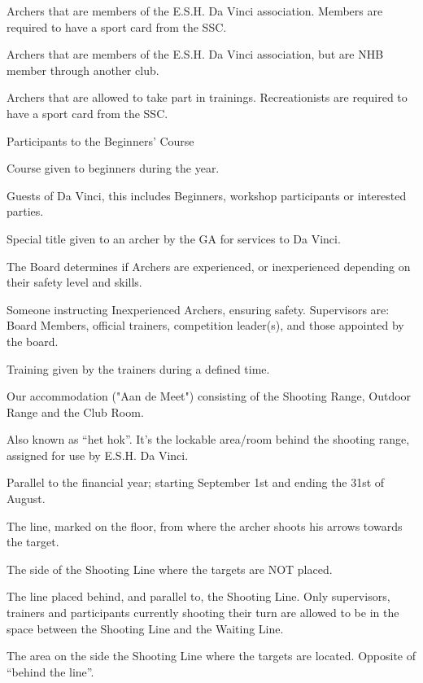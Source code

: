 \documentclass[a4paper]{article}
\begin{document}
\begin{description}[font=\sffamily\bfseries, leftmargin=1cm, style=nextline]
\item[Member]
Archers that are members of the E.S.H. Da Vinci association. Members are required to have a sport card from the SSC.
\item[External Member]
Archers that are members of the E.S.H. Da Vinci association, but are NHB member through another club.
\item[Recreationist]
Archers that are allowed to take part in trainings. Recreationists are required to have a sport card from the SSC.
\item[Beginner]
Participants to the Beginners' Course
\item[Beginners' Course] Course given to beginners during the year.
\item[Guest] Guests of Da Vinci, this includes Beginners, workshop participants or interested parties.
\item[Honorary Member] Special title given to an archer by the GA for services to Da Vinci.
\item[Experienced - Inexperienced] The Board determines if Archers are experienced, or inexperienced depending on their safety level and skills.
\item[Supervisor] Someone instructing Inexperienced Archers, ensuring safety. Supervisors are: Board Members, official trainers, competition leader(s), and those appointed by the board.
\item[General Training] Training given by the trainers during a defined time.

\item[Accommodation] Our accommodation ("Aan de Meet") consisting of the Shooting Range, Outdoor Range and the Club Room.
\item[Club Room] Also known as “het hok”. It’s the lockable area/room behind the shooting range, assigned for use by E.S.H. Da Vinci.
    \item[Association Year]
    Parallel to the financial year; starting September 1st and ending the 31st of August. 
    
    \item[Shooting Line]
    The line, marked on the floor, from where the archer shoots his arrows towards the target.
    \item[“Behind the line”]
    The side of the Shooting Line where the targets are NOT placed. 
    \item[Waiting Line]
The line placed behind, and parallel to, the Shooting Line. Only supervisors, trainers and participants currently shooting their turn are allowed to be in the space between the Shooting Line and the Waiting Line. 


\item[Downrange of the Line] The area on the side the Shooting Line where the targets are located. Opposite of ``behind the line''.

\end{description}
\end{document}
